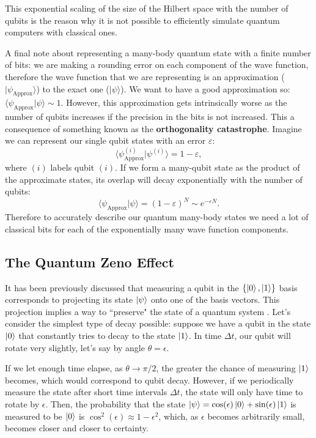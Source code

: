 \documentclass[12pt]{article}
\begin{document}
This exponential scaling of the size of the Hilbert space with the number of qubits is the reason why it is not possible to efficiently simulate quantum computers with classical ones.

A final note about representing a many-body quantum state with a finite number of bits: we are making a rounding error on each component of the wave function, therefore the wave function  that we are representing is an approximation ($|\psi_{\textrm{Approx}} \rangle$) to the exact one ($|\psi \rangle$). We want to have a good approximation so: $\langle \psi_{\textrm{Approx}}|\psi \rangle \sim 1$. However, this approximation gets intrinsically worse as the number of qubits increases if the precision in the bits is not increased. This a consequence of something known as the \textbf{orthogonality catastrophe}. Imagine we can represent our single qubit states with an error $\varepsilon$:
$$\langle \psi_{\textrm{Approx}}^{(i)}|\psi ^{(i)} \rangle = 1-\varepsilon,$$ 
where $(i)$ labels qubit $(i)$. If we form a many-qubit state as the product of the approximate states, its overlap will decay exponentially with the number of qubits:
\[\langle \psi_{\textrm{Approx}}|\psi  \rangle = (1-\varepsilon)^N \sim e^{-\varepsilon N}.\]
Therefore to accurately describe our quantum many-body states we need a lot of classical bits for each of the exponentially many wave function components.








\subsection{The Quantum Zeno Effect}
It has been previously discussed that measuring a qubit in the $\{\ket{0}, \ket{1}\}$ basis corresponds to projecting its state $\ket{\psi}$ onto one of the basis vectors. This projection implies a way to ``preserve" the state of a quantum system \cite{zeno}. Let's consider the simplest type of decay possible: suppose we have a qubit in the state $\ket{0}$ that constantly tries to decay to the state $\ket{1}$. In time $\Delta t$, our qubit will rotate very slightly, let's say by angle $\theta = \epsilon$.

If we let enough time elapse, as $\theta \to \pi/2$, the greater the chance of measuring $\ket{1}$ becomes, which would correspond to qubit decay. However, if we periodically measure the state after short time intervals $\Delta t$, the state will only have time to rotate by $\epsilon$. Then, the probability that the state $\ket{\psi} = \cos(\epsilon)\ket{0} + \sin(\epsilon)\ket{1}$ is measured to be $\ket{0}$ is $\cos^2(\epsilon) \approx 1-\epsilon^2$, which, as $\epsilon$ becomes arbitrarily small, becomes closer and closer to certainty.
\end{document}
